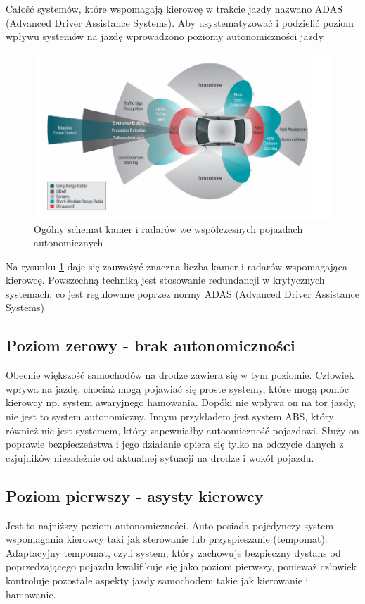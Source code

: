 Całość systemów, które wspomagają kierowcę w trakcie jazdy nazwano ADAS (Advanced Driver Assistance Systems). Aby usystematyzować  i podzielić poziom wpływu systemów na jazdę wprowadzono poziomy autonomiczności jazdy.

\begin{figure}
  \centering
  \includegraphics[width=13cm]{img/systemy_autonomiczne_ogolnie.png}
  \caption{Ogólny schemat kamer i radarów we współczesnych pojazdach autonomicznych\cite{S1}}
  \label{fig:kamery_i_radary}
\end{figure}

Na rysunku \ref{fig:kamery_i_radary} daje się zauważyć znaczna liczba kamer i radarów wspomagająca kierowcę. Powszechną techniką jest stosowanie redundancji w krytycznych systemach, co jest regulowane poprzez normy ADAS (Advanced Driver Assistance Systems)

\subsection{Poziom zerowy - brak autonomiczności}
Obecnie większość samochodów na drodze zawiera się w tym poziomie. Człowiek wpływa na jazdę, chociaż mogą pojawiać się proste systemy, które mogą pomóc kierowcy np. system awaryjnego hamowania. Dopóki nie wpływa on na tor jazdy, nie jest to system autonomiczny. Innym przykładem jest system ABS, który również nie jest systemem, który zapewniałby autoomiczność pojazdowi. Służy on poprawie bezpieczeństwa i jego działanie opiera się tylko na odczycie danych z czjujników niezależnie od aktualnej sytuacji na drodze i wokół pojazdu.

\subsection{Poziom pierwszy - asysty kierowcy}
Jest to najniższy poziom autonomiczności. Auto posiada pojedynczy system wspomagania kierowcy taki jak sterowanie lub przyspieszanie (tempomat). Adaptacyjny tempomat, czyli system, który zachowuje bezpieczny dystans od poprzedzającego pojazdu kwalifikuje się jako poziom pierwszy, ponieważ człowiek kontroluje pozostałe aspekty jazdy samochodem takie jak kierowanie i hamowanie.


